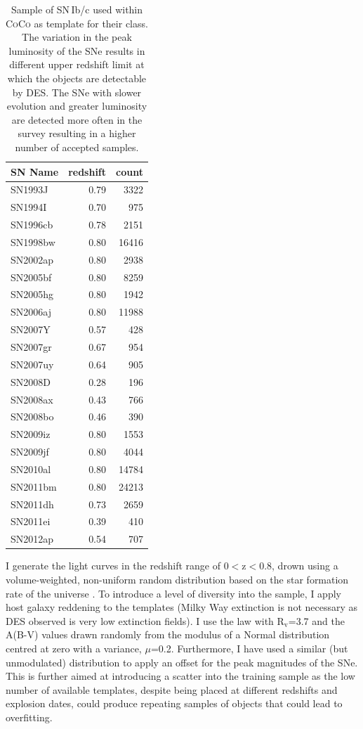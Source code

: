 \begin{table}
  \caption{Sample of SN\,Ib/c used within \textsc{CoCo} as template for their class. The variation in the peak luminosity of the SNe results in different upper redshift limit at which the objects are detectable by DES. The SNe with slower evolution and greater luminosity are detected more often in the survey resulting in a higher number of accepted samples.}
  \label{tab:IbcTemplates}
  \centering
  \begin{tabular}{l|r|r}
    SN Name  & redshift & count \\
    \hline
    SN1993J  & 0.79 &  3322  \\
    SN1994I  & 0.70 &   975  \\
    SN1996cb & 0.78 &  2151  \\
    SN1998bw & 0.80 & 16416  \\
    SN2002ap & 0.80 &  2938  \\
    SN2005bf & 0.80 &  8259  \\
    SN2005hg & 0.80 &  1942  \\
    SN2006aj & 0.80 & 11988  \\
    SN2007Y  & 0.57 &   428  \\
    SN2007gr & 0.67 &   954  \\
    SN2007uy & 0.64 &   905  \\
    SN2008D  & 0.28 &   196  \\
    SN2008ax & 0.43 &   766  \\
    SN2008bo & 0.46 &   390  \\
    SN2009iz & 0.80 &  1553  \\
    SN2009jf & 0.80 &  4044  \\
    SN2010al & 0.80 & 14784  \\
    SN2011bm & 0.80 & 24213  \\
    SN2011dh & 0.73 &  2659  \\
    SN2011ei & 0.39 &   410  \\
    SN2012ap & 0.54 &   707
  \end{tabular}
\end{table}

I generate the light curves in the redshift range of 0$<$z$<$0.8, drown using a volume-weighted, non-uniform random distribution based on the star formation rate of the universe \citep{Hopkins2006}. To introduce a level of diversity into the sample, I apply host galaxy reddening to the templates (Milky Way extinction is not necessary as DES observed is very low extinction fields). I use the \citet{Cardelli1989} law with R$_\mathrm{v}$=3.7 and the A(B-V) values drawn randomly from the modulus of a Normal distribution centred at zero with a variance, $\mu$=0.2. Furthermore, I have used a similar (but unmodulated) distribution to apply an offset for the peak magnitudes of the SNe. This is further aimed at introducing a scatter into the training sample as the low number of available templates, despite being placed at different redshifts and explosion dates, could produce repeating samples of objects that could lead to overfitting.

